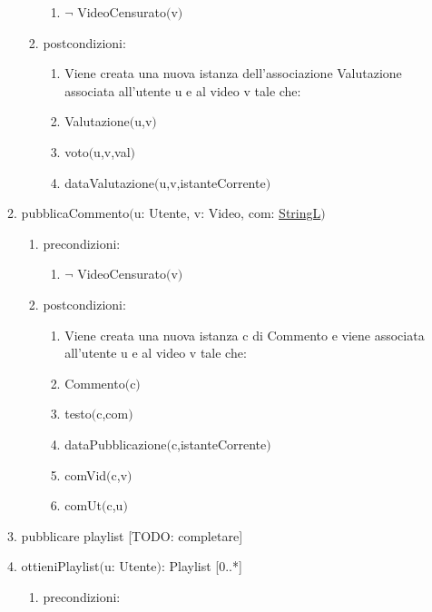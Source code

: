 \documentclass{article}
\begin{document}
\begin{enumerate}
\begin{enumerate}
\begin{enumerate}
\begin{enumerate}
                \item $\neg$ VideoCensurato$($v$)$
            \end{enumerate}
            \item postcondizioni:
            \begin{enumerate}
                \item Viene creata una nuova istanza dell'associazione Valutazione associata all'utente u e al video v tale che:
                \item Valutazione$($u,v$)$
                \item voto$($u,v,val$)$
                \item dataValutazione$($u,v,istanteCorrente$)$
            \end{enumerate}
        \end{enumerate}
        \item pubblicaCommento$($u: Utente, v: Video, com: \hyperref[sec:TipoStringL]{StringL}$)$
        \begin{enumerate}
            \item precondizioni:
            \begin{enumerate}
                \item $\neg$ VideoCensurato$($v$)$
            \end{enumerate}
            \item postcondizioni:
            \begin{enumerate}
                \item Viene creata una nuova istanza c di Commento e viene associata all'utente u e al video v tale che:
                \item Commento$($c$)$
                \item testo$($c,com$)$
                \item dataPubblicazione$($c,istanteCorrente$)$
                \item comVid$($c,v$)$
                \item comUt$($c,u$)$
            \end{enumerate}
        \end{enumerate}
        \item pubblicare playlist [TODO: completare]
        \item ottieniPlaylist$($u: Utente$)$: Playlist [0..*]
        \begin{enumerate}
            \item precondizioni:
            \begin{enumerate}

\end{enumerate}
\end{enumerate}
\end{enumerate}
\end{enumerate}
\end{document}
